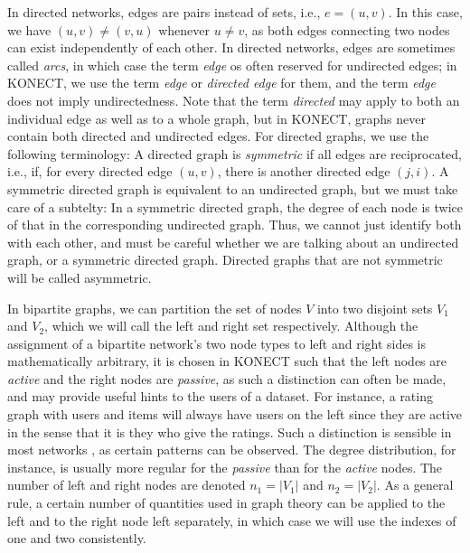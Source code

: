 \documentclass{article}
\begin{document}
In directed networks, edges are pairs instead of sets, i.e.,
$e=(u,v)$.  In this case, we have $(u,v)\neq(v,u)$ whenever $u \neq v$, 
as both edges connecting two nodes can exist independently of each
other. 
In directed networks, edges are sometimes called
\emph{arcs}, in which case the term \emph{edge} os often reserved for
undirected edges; in KONECT, we use the term \emph{edge} or \emph{directed
  edge} for them, and the term \emph{edge} does not imply
undirectedness.  Note that the term \emph{directed} may apply to both an
individual edge as well as to a whole graph, but in KONECT, graphs never
contain both directed and undirected edges.  
For directed graphs, we use the following terminology:  A directed graph
is \emph{symmetric} if all edges are reciprocated, i.e., if, for every
directed edge $(u,v)$, there is another directed edge $(j,i)$.  A
symmetric directed graph is equivalent to an undirected graph, but we
must take care of a subtelty:  In a symmetric directed graph, the degree
of each node is twice of that in the corresponding undirected graph.
Thus, we cannot just identify both with each other, and must be careful
whether we are talking about an undirected graph, or a symmetric
directed graph.  Directed graphs that are not symmetric will be called
asymmetric. 

In bipartite graphs, we can partition the set of nodes $V$ into two
disjoint sets $V_1$ and $V_2$, which we will call the left and right
set respectively.  Although the assignment of a bipartite network's two
node types to left and right sides is mathematically arbitrary, it is
chosen in KONECT such that the left nodes are \emph{active} and the
right nodes are \emph{passive}, as such a distinction can often be made,
and may provide useful hints to the users of a dataset.  For instance, a rating graph with users
and items will always have users on the left since they are active in
the sense that it is they who give the ratings. 
Such a distinction is sensible in most networks \citep{b732}, as certain
patterns can be observed.  The degree distribution, for instance, is
usually more regular for the \emph{passive} than for the \emph{active} nodes.
The number of left and
right nodes are denoted $n_1 = |V_1|$ and $n_2 = |V_2|$.  As a general
rule, a certain number of quantities used in graph theory can be applied
to the left and to the right node left separately, in which case we will
use the indexes of one and two consistently. 
\end{document}
